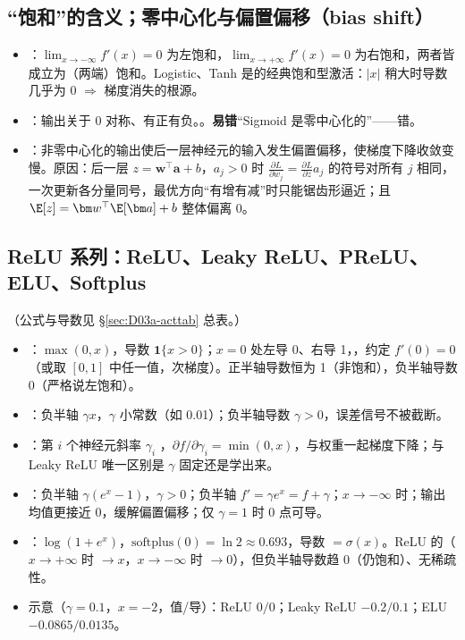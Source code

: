 \subsection{“饱和”的含义；零中心化与偏置偏移（bias shift）}
\begin{itemize}
\item {}：$\lim_{x\to-\infty}f'(x)=0$ 为左饱和，$\lim_{x\to+\infty}f'(x)=0$ 为右饱和，两者皆成立为（两端）饱和。Logistic、Tanh 是的经典饱和型激活：$|x|$ 稍大时导数几乎为 0 $\Rightarrow$ 梯度消失的根源。
\item {}：输出关于 0 对称、有正有负。。\textbf{易错}“Sigmoid 是零中心化的”——错。
\item {}：非零中心化的输出使后一层神经元的输入发生偏置偏移，使梯度下降收敛变慢。原因：后一层 $z=\bm w^\top\bm a+b$，$a_j>0$ 时 $\frac{\partial L}{\partial w_j}=\frac{\partial L}{\partial z}a_j$ 的符号对所有 $j$ 相同，一次更新各分量同号，最优方向“有增有减”时只能锯齿形逼近；且 $\E[z]=\bm w^\top\E[\bm a]+b$ 整体偏离 0。
\end{itemize}

\subsection{ReLU 系列：ReLU、Leaky ReLU、PReLU、ELU、Softplus}
（公式与导数见 §\ref{sec:D03a-acttab} 总表。）
\begin{itemize}
\item {}：$\max(0,x)$，导数 $\mathbf 1\{x>0\}$；$x=0$ 处左导 0、右导 1，，约定 $f'(0)=0$（或取 $[0,1]$ 中任一值，次梯度）。正半轴导数恒为 1（非饱和），负半轴导数 0（严格说左饱和）。
\item {}：负半轴 $\gamma x$，$\gamma$ 小常数（如 0.01）；负半轴导数 $\gamma>0$，误差信号不被截断。
\item {}：第 $i$ 个神经元斜率 $\gamma_i$ ，$\partial f/\partial\gamma_i=\min(0,x)$，与权重一起梯度下降；与 Leaky ReLU 唯一区别是 $\gamma$ 固定还是学出来。
\item {}：负半轴 $\gamma(e^x-1)$，$\gamma>0$；负半轴 $f'=\gamma e^x=f+\gamma$；$x\to-\infty$ 时；输出均值更接近 0，缓解偏置偏移；仅 $\gamma=1$ 时 0 点可导。
\item {}：$\log(1+e^x)$，$\mathrm{softplus}(0)=\ln2\approx0.693$，导数 $=\sigma(x)$。ReLU 的（$x\to+\infty$ 时 $\to x$，$x\to-\infty$ 时 $\to0$），但负半轴导数趋 0（仍饱和）、无稀疏性。
\item 示意（$\gamma=0.1$，$x=-2$，值/导）：ReLU $0/0$；Leaky ReLU $-0.2/0.1$；ELU $-0.0865/0.0135$。
\end{itemize}

